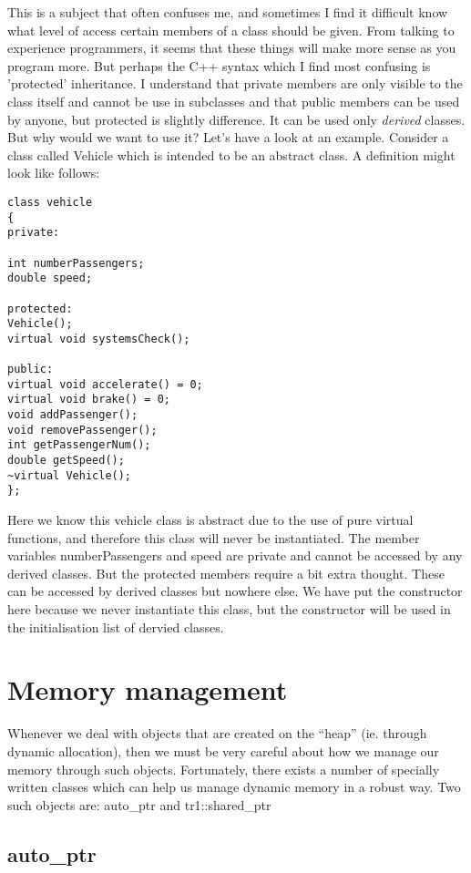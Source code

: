 This is a subject that often confuses me, and sometimes I find it difficult know what level of access certain members of a class should be given. From talking to experience programmers, it seems that these things will make more sense as you program more. But perhaps the C++ syntax which I find most confusing is 'protected' inheritance. I understand that private members are only visible to the class itself and cannot be use in subclasses and that public members can be used by anyone, but protected is slightly difference. It can be used only \emph{derived} classes.  But why would we want to use it? Let's have a look at an example. Consider a class called Vehicle which is intended to be an abstract class. A definition might look like follows:
\begin{lstlisting}
class vehicle
{
private:

int numberPassengers;
double speed;

protected:
Vehicle();
virtual void systemsCheck();

public:
virtual void accelerate() = 0;
virtual void brake() = 0;
void addPassenger();
void removePassenger();
int getPassengerNum();
double getSpeed();
~virtual Vehicle();
};
\end{lstlisting}
Here we know this vehicle class is abstract due to the use of pure virtual functions, and therefore this class will never be instantiated. The member variables numberPassengers and speed are private and cannot be accessed by any derived classes. But the protected members require a bit extra thought. These can be accessed by derived classes but nowhere else. We have put the constructor here because we never instantiate this class, but the constructor will be used in the initialisation list of dervied classes. 





\section{Memory management}
\label{sec:memory-management}

Whenever we deal with objects that are created on the ``heap''
(ie. through dynamic allocation), then we must be very careful about
how we manage our memory through such objects. Fortunately, there
exists a number of specially written classes which can help us manage
dynamic memory in a robust way. Two such objects are: auto\_ptr and tr1::shared\_ptr

\subsection{auto\_ptr}
\label{sec:auto_ptr}

